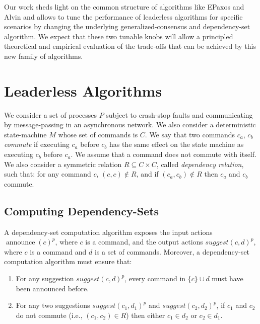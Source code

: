 Our work sheds light on the common structure of algorithms like EPaxos and Alvin and allows to tune the performance of leaderless algorithms for specific scenarios by changing the underlying generalized-consensus and dependency-set algorithm. 
We expect that these two tunable knobs will allow a principled theoretical and empirical evaluation of the trade-offs that can be achieved by this new family of algorithms.

\section{Leaderless Algorithms}



We consider a set of processes $P$ subject to crash-stop faults and communicating by message-passing in an asynchronous network.
We also consider a deterministic state-machine $M$ whose set of commands is $C$. 
We say that two commands $c_a$, $c_b$ \textit{commute} if executing $c_a$ before $c_b$ has the same effect on the state machine as executing $c_b$ before $c_a$. We assume that a command does not commute with itself.
We also consider a symmetric relation $R \subseteq C\times C$, called \textit{dependency relation}, such that: for any command $c$, $\left( c,c \right)\notin R$, and if $\left( c_a,c_b \right)\notin R$ then $c_a$ and $c_b$ commute. 

\subsection{Computing Dependency-Sets}

A dependency-set computation algorithm exposes the input actions ${\operatorname{announce}\left( c \right)}^p$, where $c$ is a command, and the output actions ${suggest\left( c, d \right)}^p$, where $c$ is a command and $d$ is a set of commands.
Moreover, a dependency-set computation algorithm must ensure that:
\begin{enumerate}
    \item For any suggestion ${suggest\left( c, d \right)}^p$, every command in $\{c\}\cup d$ must have been announced before.
    \item For any two suggestions ${suggest\left( c_1, d_1 \right)}^p$ and ${suggest\left( c_2, d_2 \right)}^p$,  if $c_1$ and $c_2$ do not commute (i.e., $\left( c_1,c_2 \right) \in R$) then either $c_1\in d_2$ or $c_2 \in d_1$.
\end{enumerate}

